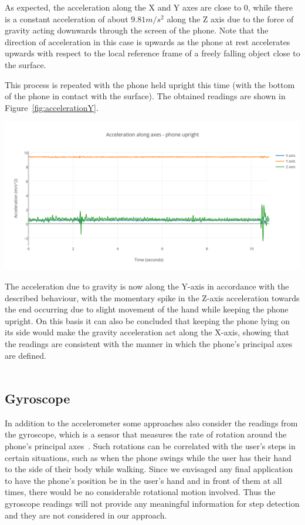 \documentclass[main.tex]{subfiles}
\begin{document}
As expected, the acceleration along the X and Y axes are close to 0, while there is a constant acceleration of about $9.81 m/s^2$ along the Z axis due to the force of gravity acting downwards through the screen of the phone. Note that the direction of acceleration in this case is upwards as the phone at rest accelerates upwards with respect to the local reference frame of a freely falling object close to the surface. 

This process is repeated with the phone held upright this time (with the bottom of the phone in contact with the surface). The obtained readings are shown in Figure~\ref{fig:accelerationY}.

\begin{center}
\includegraphics[scale=0.9]{images/accelerationY.png}
\label{fig:accelerationY}
\end{center}

The acceleration due to gravity is now along the Y-axis in accordance with the described behaviour, with the momentary spike in the Z-axis acceleration towards the end occurring due to slight movement of the hand while keeping the phone upright. On this basis it can also be concluded that keeping the phone lying on its side would make the gravity acceleration act along the X-axis, showing that the readings are consistent with the manner in which the phone's principal axes are defined. 
\\
\\
\subsection{Gyroscope}
In addition to the accelerometer some approaches also consider the readings from the gyroscope, which is a sensor that measures the rate of rotation around the phone's principal axes~\cite{accelerometerAcceleration}. Such rotations can be correlated with the user's steps in certain situations, such as when the phone swings while the user has their hand to the side of their body while walking. Since we envisaged any final application to have the phone's position be in the user's hand and in front of them at all times, there would be no considerable rotational motion involved. Thus the gyroscope readings will not provide any meaningful information for step detection and they are not considered in our approach. 
\end{document}
